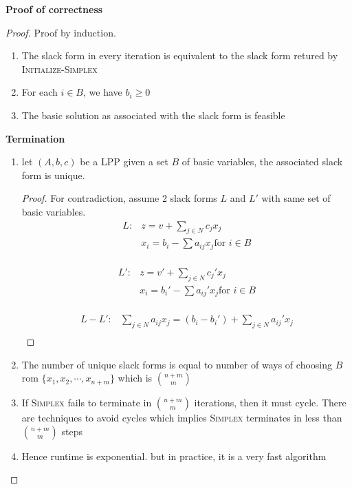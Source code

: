 \documentclass[11pt]{article}
\begin{document}
\begin{theorem*}
    \textbf{Proof of correctness}
    \begin{proof}
        Proof by induction. 
        \begin{enumerate}
            \item The slack form in every iteration is equivalent to the slack form retured by \textsc{Initialize-Simplex}
            \item For each $i\in B$, we have $b_i \geq 0$
            \item The basic solution as associated with the slack form is feasible
        \end{enumerate}
        \textbf{Termination}
        \begin{enumerate}
            \item let $(A,b,c)$ be a LPP given a set $B$ of basic variables, the associated slack form is unique.  
            \begin{proof}
                For contradiction, assume 2 slack forms $L$ and $L'$ with same set of basic variables. 
                \begin{align*}
                    L: & z = v + \sum_{j\in N} c_j x_j \\
                       & x_i = b_i - \sum a_{ij} x_j \text{for $i\in B$}\\
                \end{align*}

                \begin{align*}
                    L': & z = v' + \sum_{j\in N}c_j' x_j \\
                    & x_i = b_i' - \sum a_{ij}' x_j \text{for $i\in B$}\\
                \end{align*}

                \begin{align*}
                    L - L': & \sum_{j\in N} a_{ij} x_j = (b_i - b_i') + \sum_{j\in N} a_{ij}' x_j \\
                \end{align*}
            \end{proof}
            \item The number of unique slack forms is equal to number of ways of choosing $B$ rom $\{ x_1, x_2, \cdots, x_{n+m}\}$ which is $\binom{n+m}{m}$
            \item If \textsc{Simplex} fails to terminate in $\binom{n+m}{m}$ iterations, then it must cycle. There are techniques to avoid cycles which implies \textsc{Simplex} terminates in less than $\binom{n+m}{m}$ steps
            \item Hence runtime is exponential. but in practice, it is a very fast algorithm
        \end{enumerate}
    \end{proof}
\end{theorem*}
\end{document}
